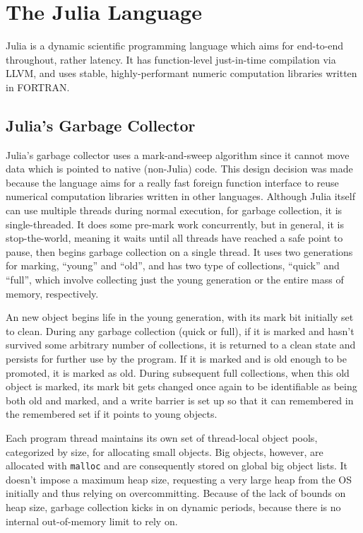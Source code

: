 \section{The Julia Language} \label{julia}
Julia is a dynamic scientific programming language which aims for end-to-end throughout, rather latency.
It has function-level just-in-time compilation via LLVM, and uses stable, highly-performant numeric computation libraries written in FORTRAN.

\subsection{Julia's Garbage Collector}
Julia's garbage collector uses a mark-and-sweep algorithm since it cannot move data which is pointed to native (non-Julia) code.
This design decision was made because the language aims for a really fast foreign function interface to reuse numerical computation libraries written in other languages.
Although Julia itself can use multiple threads during normal execution, for garbage collection, it is single-threaded.
It does some pre-mark work concurrently, but in general, it is stop-the-world, meaning it waits until all threads have reached a safe point to pause, then begins garbage collection on a single thread.
It uses two generations for marking, ``young'' and ``old'', and has two type of collections, ``quick'' and ``full'', which involve collecting just the young generation or the entire mass of memory, respectively.

An new object begins life in the young generation, with its mark bit initially set to clean.
During any garbage collection (quick or full), if it is marked and hasn't survived some arbitrary number of collections, it is returned to a clean state and persists for further use by the program.
If it is marked and is old enough to be promoted, it is marked as old.
During subsequent full collections, when this old object is marked, its mark bit gets changed once again to be identifiable as being both old and marked, and a write barrier is set up so that it can remembered in the remembered set if it points to young objects.

Each program thread maintains its own set of thread-local object pools, categorized by size, for allocating small objects.
Big objects, however, are allocated with \texttt{malloc} and are consequently stored on global big object lists.
It doesn't impose a maximum heap size, requesting a very large heap from the OS initially and thus relying on overcommitting.
Because of the lack of bounds on heap size, garbage collection kicks in on dynamic periods, because there is no internal out-of-memory limit to rely on.

